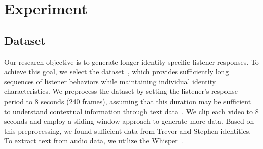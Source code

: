 \section{Experiment}
\begin{table}[t]
\centering
\caption{Ablation study results based on codebook size at Trevor dataset. GT denotes the Ground Truth.}
\label{tab: ablation codebook size}
\vspace{-0.2cm}
\end{table}

\subsection{Dataset}
Our research objective is to generate longer identity-specific listener responses. To achieve this goal, we select the dataset~\cite{ng2023can,ng2022learning}, which provides sufficiently long sequences of listener behaviors while maintaining individual identity characteristics.
We preprocess the dataset by setting the listener’s response period to 8 seconds (240 frames), assuming that this duration may be sufficient to understand contextual information through text data~\cite{ng2023can}.
We clip each video to 8 seconds and employ a sliding-window approach to generate more data.
Based on this preprocessing, we found sufficient data from Trevor and Stephen identities.
To extract text from audio data, we utilize the Whisper~\cite{radford2022robust}.


